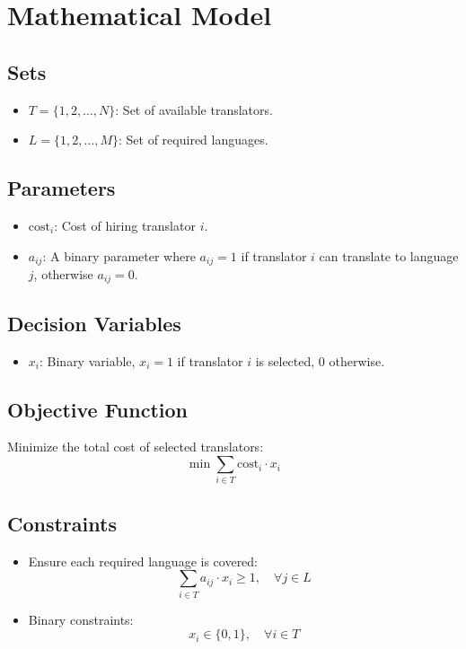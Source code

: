 \documentclass{article}
\begin{document}
\section*{Mathematical Model}

\subsection*{Sets}
\begin{itemize}
    \item \( T = \{1, 2, \ldots, N\} \): Set of available translators.
    \item \( L = \{1, 2, \ldots, M\} \): Set of required languages.
\end{itemize}

\subsection*{Parameters}
\begin{itemize}
    \item \( \text{cost}_i \): Cost of hiring translator \( i \).
    \item \( a_{ij} \): A binary parameter where \( a_{ij} = 1 \) if translator \( i \) can translate to language \( j \), otherwise \( a_{ij} = 0 \).
\end{itemize}

\subsection*{Decision Variables}
\begin{itemize}
    \item \( x_i \): Binary variable, \( x_i = 1 \) if translator \( i \) is selected, \( 0 \) otherwise.
\end{itemize}

\subsection*{Objective Function}
Minimize the total cost of selected translators:
\[
\min \sum_{i \in T} \text{cost}_i \cdot x_i
\]

\subsection*{Constraints}
\begin{itemize}
    \item Ensure each required language is covered:
    \[
    \sum_{i \in T} a_{ij} \cdot x_i \geq 1, \quad \forall j \in L
    \]

    \item Binary constraints:
    \[
    x_i \in \{0, 1\}, \quad \forall i \in T
    \]
\end{itemize}
\end{document}
